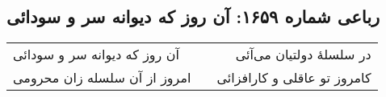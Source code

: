 \begin{center}
\section*{رباعی شماره ۱۶۵۹: آن روز که دیوانه سر و سودائی}
\label{sec:1659}
\begin{longtable}{l p{0.5cm} r}
آن روز که دیوانه سر و سودائی
&&
در سلسلهٔ دولتیان می‌آئی
\\
امروز از آن سلسله زان محرومی
&&
کامروز تو عاقلی و کارافزائی
\\
\end{longtable}
\end{center}
